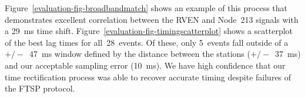 Figure~\ref{evaluation-fig-broadbandmatch} shows an example of this process
that demonstrates excellent correlation between the RVEN and Node~213 signals
with a 29~ms time shift. Figure~\ref{evaluation-fig-timingscatterplot} shows
a scatterplot of the best lag times for all~28~events. Of these, only
5~events fall outside of a $+/-$~47~ms window defined by the distance between
the stations ($+/-$~37~ms) and our acceptable sampling error (10~ms). We have
high confidence that our time rectification process was able to recover
accurate timing despite failures of the FTSP protocol.
